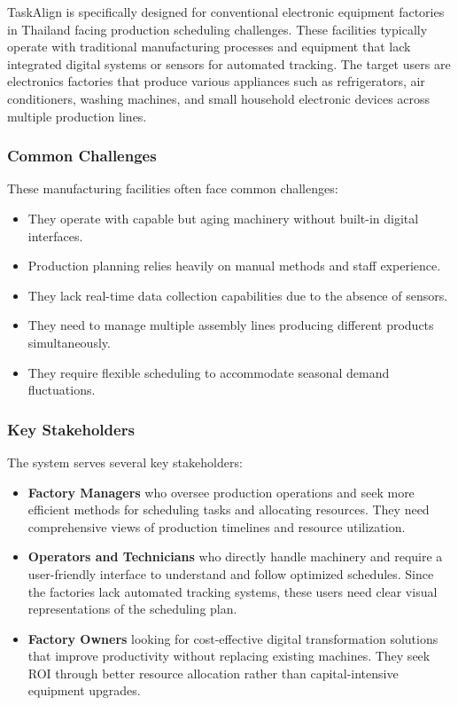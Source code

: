 TaskAlign is specifically designed for conventional electronic equipment factories in Thailand facing production scheduling challenges. These facilities typically operate with traditional manufacturing processes and equipment that lack integrated digital systems or sensors for automated tracking. The target users are electronics factories that produce various appliances such as refrigerators, air conditioners, washing machines, and small household electronic devices across multiple production lines.

\subsubsection{Common Challenges}
These manufacturing facilities often face common challenges:
\begin{itemize}
    \item They operate with capable but aging machinery without built-in digital interfaces.
    \item Production planning relies heavily on manual methods and staff experience.
    \item They lack real-time data collection capabilities due to the absence of sensors.
    \item They need to manage multiple assembly lines producing different products simultaneously.
    \item They require flexible scheduling to accommodate seasonal demand fluctuations.
\end{itemize}

\subsubsection{Key Stakeholders}
The system serves several key stakeholders:
\begin{itemize}
    \item \textbf{Factory Managers} who oversee production operations and seek more efficient methods for scheduling tasks and allocating resources. They need comprehensive views of production timelines and resource utilization.
    \item \textbf{Operators and Technicians} who directly handle machinery and require a user-friendly interface to understand and follow optimized schedules. Since the factories lack automated tracking systems, these users need clear visual representations of the scheduling plan.
    \item \textbf{Factory Owners} looking for cost-effective digital transformation solutions that improve productivity without replacing existing machines. They seek ROI through better resource allocation rather than capital-intensive equipment upgrades.
\end{itemize}

